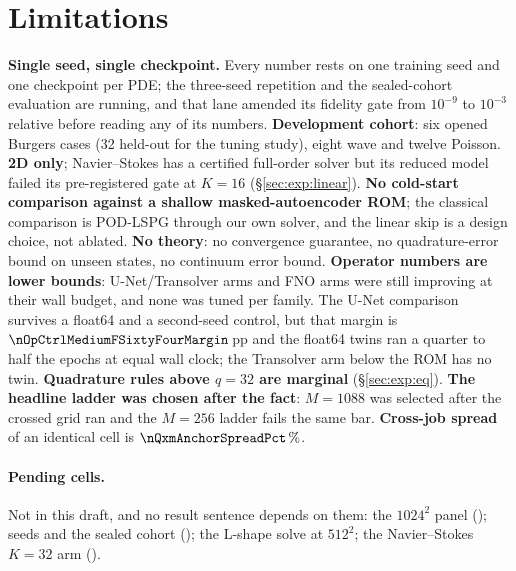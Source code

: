 \section{Limitations}
\label{sec:limitations}

\textbf{Single seed, single checkpoint.} Every number rests on one training
seed and one checkpoint per PDE; the three-seed repetition and the sealed-cohort
evaluation are running, and that lane amended its fidelity gate from $10^{-9}$
to $10^{-3}$ relative before reading any of its numbers.
\textbf{Development cohort}: six opened Burgers cases (32 held-out for the
tuning study), eight wave and twelve Poisson.
\textbf{2D only}; Navier--Stokes has a certified full-order solver but its
reduced model failed its pre-registered gate at $K=16$ (\S\ref{sec:exp:linear}).
\textbf{No cold-start comparison against a shallow masked-autoencoder ROM}; the
classical comparison is POD-LSPG through our own solver, and the linear skip is
a design choice, not ablated. \textbf{No theory}: no convergence guarantee, no
quadrature-error bound on unseen states, no continuum error bound.
\textbf{Operator numbers are lower bounds}: \nOpLaneImproving{}
U-Net/Transolver arms and \nOpFnoImproving{} FNO arms were still improving at
their wall budget, and none was tuned per family. The U-Net comparison survives
a float64 and a second-seed control, but that margin is
$\nOpCtrlMediumFSixtyFourMargin$\,pp and the float64 twins ran a quarter to half
the epochs at equal wall clock; the Transolver arm below the ROM has no twin.
\textbf{Quadrature rules above $q=32$ are marginal} (\S\ref{sec:exp:eq}).
\textbf{The headline ladder was chosen after the fact}: $M=1088$ was selected
after the crossed grid ran and the $M=256$ ladder fails the same bar.
\textbf{Cross-job spread} of an identical cell is $\nQxmAnchorSpreadPct\,\%$.

\paragraph{Pending cells.} Not in this draft, and no result sentence depends on
them: the $1024^2$ panel (\nPanelTenTwentyFour); seeds and the sealed cohort
(\nSeedsStatus); the L-shape solve at $512^2$; the Navier--Stokes $K=32$ arm
(\nNsKthirtyTwo).
